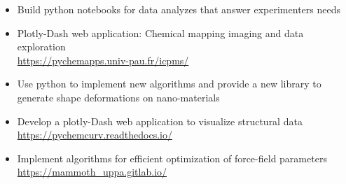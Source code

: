 \documentclass[10pt,a4paper,ragged2e]{../altacv}
\begin{document}
\medskip

\vspace{-2mm}
\begin{itemize}\setlength{\itemsep}{0ex}
    \item Build python notebooks for data analyzes that answer experimenters needs
    \item Plotly-Dash web application: Chemical mapping imaging and data exploration\\
    \url{https://pychemapps.univ-pau.fr/icpms/}
\end{itemize}

\medskip

\vspace{-2mm}
\begin{itemize}\setlength{\itemsep}{0ex}
    \item Use python to implement new algorithms and provide a new library to generate shape deformations on nano-materials
    \item Develop a plotly-Dash web application to visualize structural data\\
    \url{https://pychemcurv.readthedocs.io/}
\end{itemize}


\medskip

\vspace{-2mm}
\begin{itemize}\setlength{\itemsep}{0ex}
    \item Implement algorithms for efficient optimization of force-field parameters\\
    \url{https://mammoth_uppa.gitlab.io/}
\end{itemize}
\end{document}
